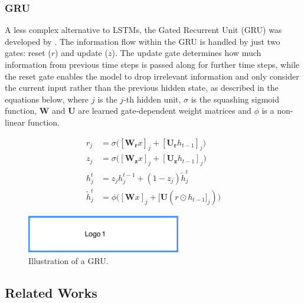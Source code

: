 
\subsubsection{GRU}\label{GRU}
A less complex alternative to LSTMs, the Gated Recurrent Unit (GRU) was developed by \cite{Cho2014}. The information flow within the GRU is handled by just two gates: reset ($r$) and update ($z$). The update gate determines how much information from previous time steps is passed along for further time steps, while the reset gate enables the model to drop irrelevant information and only consider the current input rather than the previous hidden state, as described in the equations below, where $j$ is the $j$-th hidden unit, $\sigma$ is the squashing sigmoid function, $\boldsymbol{W}$ and $\boldsymbol{U}$ are learned gate-dependent weight matrices and $\phi$ is a non-linear function.

\begin{align*}
r_j &= \sigma \big( [\boldsymbol{W_{r}}x]_{j} + [\boldsymbol{U_{r}}h_{t-1}]_{j} \big) \\
z_j &= \sigma \big( [\boldsymbol{W_{z}}x]_{j} + [\boldsymbol{U_{z}}h_{t-1}]_{j} \big) \\
h_{j}^{t} &= z_{j}h_{j}^{t-1} + (1 - z_{j}) \tilde{h}_{j}^{t} \\
\tilde{h}_{j}^{t} &= \phi \big( [\boldsymbol{W}x]_{j} +[\boldsymbol{U}(r \odot h_{t-1}]_{j}) \big)
\end{align*}

\begin{figure}[htb]
 \centering
 \includegraphics[width=0.6\textwidth]{abb/logo1}
 \caption[Illustration of a GRU]{Illustration of a GRU.}
\label{fig:GRU}
\end{figure}


\subsection{Related Works}\label{relatedWorks}

